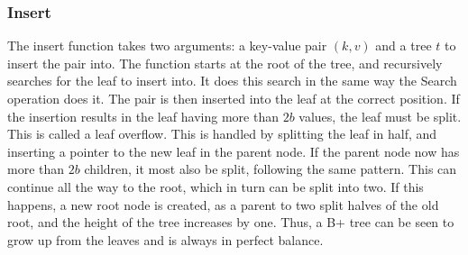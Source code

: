 \subsubsection{Insert}
The insert function takes two arguments: a key-value pair $(k, v)$ and a tree $t$ to insert the pair into. The function starts at the root of the tree, and recursively searches for the leaf to insert into. It does this search in the same way the Search operation does it. The pair is then inserted into the leaf at the correct position. If the insertion results in the leaf having more than $2b$ values, the leaf must be split. This is called a leaf overflow. This is handled by splitting the leaf in half, and inserting a pointer to the new leaf in the parent node. If the parent node now has more than $2b$ children, it most also be split, following the same pattern. This can continue all the way to the root, which in turn can be split into two. If this happens, a new root node is created, as a parent to two split halves of the old root, and the height of the tree increases by one. Thus, a B+ tree can be seen to grow up from the leaves and is always in perfect balance.
